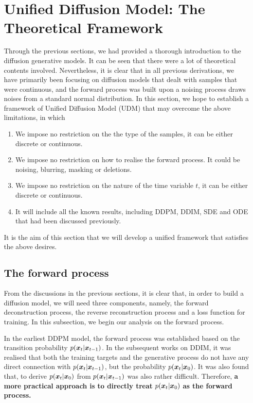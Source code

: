 \section{Unified Diffusion Model: The Theoretical Framework}

Through the previous sections, we had provided a thorough introduction to the diffusion generative models. It can be seen that  there were a lot of theoretical contents involved. Nevertheless, it is clear that in all previous derivations, we have primarily been focusing on diffusion models that dealt with samples that were continuous, and the forward process was built upon a noising process draws noises from a standard normal distribution. In this section, we hope to establish a framework of Unified Diffusion Model (UDM) that may overcome the above limitations, in which
\begin{myquote}
\begin{enumerate}
    \item We impose no restriction on the the type of the samples, it can be either discrete or continuous.
    \item We impose no restriction on how to realise the forward process. It could be noising, blurring, masking or deletions.
    \item We impose no restriction on the nature of the time variable $t$, it can be either discrete or continuous.
    \item It will include all the known results, including DDPM, DDIM, SDE and ODE that had been discussed previously.
\end{enumerate}
\end{myquote}
It is the aim of this section that we will develop a unified framework that satisfies the above desires.

\subsection{The forward process}

From the discussions in the previous sections, it is clear that, in order to build a diffusion model, we will need three components, namely, the forward deconstruction process, the reverse reconstruction process and a loss function for training. In this subsection, we begin our analysis on the forward process. 

In the earliest DDPM model, the forward process was established based on the transition probability $p(\bm{x}_{t}|\bm{x}_{t-1})$. In the subsequent works on DDIM, it was realised that both the training targets and the generative process do not have any direct connection with $p(\bm{x}_{t}|\bm{x}_{t-1})$, but the probability $p(\bm{x}_{t}|\bm{x}_0)$. It was also found that, to derive $p(\bm{x}_{t}|\bm{x}_0)$ from $p(\bm{x}_{t}|\bm{x}_{t-1})$ was also rather difficult. Therefore, \textbf{a more practical approach is to directly treat} $p(\bm{x}_{t}|\bm{x}_0)$ \textbf{as the forward process.}

